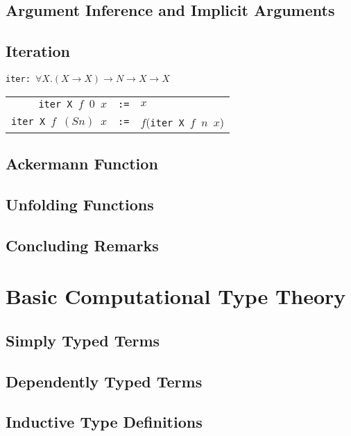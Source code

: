 \documentclass[12pt]{report}
\begin{document}
\section{Argument Inference and Implicit Arguments}

\section{Iteration}

\begin{description}[leftmargin=2.5cm, style=nextline]
  \item[\gls{iter}]
  \texttt{iter: }$\forall X.  (X \rightarrow X) \rightarrow N \rightarrow X \rightarrow X$\\
  \begin{tabular}{rcl}
    \texttt{iter X $f$ $0$ $x$}&\texttt{:=}&$x$\\
    \texttt{iter X $f$ $(S n)$ $x$}&\texttt{:=}&$f$(\texttt{iter X $f$ $n$ $x$})\\
  \end{tabular}
\end{description}

\section{Ackermann Function}

\section{Unfolding Functions}

\section{Concluding Remarks}

\chapter{Basic Computational Type Theory}

\section{Simply Typed Terms}

\section{Dependently Typed Terms}

\section{Inductive Type Definitions}
\end{document}
